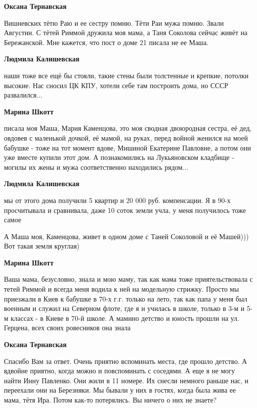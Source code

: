 \begin{itemize}
\begin{itemize}
\begin{itemize}
\textbf{Оксана Тернавская}

Вишневских тётю Раю и ее сестру помню. Тёти Раи мужа помню. Звали Августин.
С тётей Риммой дружила моя мама, а Таня Соколова сейчас живёт на Бережанской.
Мне кажется, что пост о доме 21 писала не ее Маша.

\textbf{Людмила Калишевская} 

наши тоже все ещё бы стояли, такие стены были толстенные и крепкие, потолки
высокие. Нас сносил ЦК КПУ, хотели себе там построить дома, но СССР
развалился...

\textbf{Марина Шкотт} 

писала моя Маша, Мария Каменцова, это моя сводная двоюродная сестра, её дед,
овдовев с маленькой дочкой, её мамой, на руках, перед войной женился на моей
бабушке - тоже на тот момент вдове, Мишиной Екатерине Павловне, а потом они уже
вместе купили этот дом. А познакомились на Лукьяновском кладбище - могилы их
жены и мужа соответственно находились рядом...


\textbf{Людмила Калишевская} 

мы от этого дома получили 5 квартир и 20 000 руб. компенсации. Я в 90-х
просчитывала и сравнивала, даже 10 соток земли учла, у меня получилось тоже
самое

А Маша моя, Каменцова, живет в одном доме с Таней Соколовой и её Машей))) Вот такая земля круглая)

\textbf{Марина Шкотт} 

Ваша мама, безусловно, знала и мою маму, так как мама тоже приятельствовала с
тетей Риммой и всегда меня водила к ней на модельную стрижку. Просто мы
приезжали в Киев к бабушке в 70-х г.г. только на лето, так как папа у меня был
военным и служил на Северном флоте, где я и училась в школе, только в 3-м и 5-м
классах - в Киеве в 70-й школе. А мамино детство и юность прошли на ул.
Герцена, всех своих ровесников она знала


\textbf{Оксана Тернавская}

Спасибо Вам за ответ. Очень приятно вспоминать места, где прошло детство. А
вдвойне приятно, когда можно и повспоминать с соседями. А еще я не могу найти
Инну Павленко. Они жили в 11 номере. Их снесли немного раньше нас, и переехали
они на Березняки. Мы бывали у них в гостях, когда была жива ее мама, тётя Ира.
Потом как-то потерялись. Вы ничего о них не знаете?



\end{itemize}
\end{itemize}
\end{itemize}
